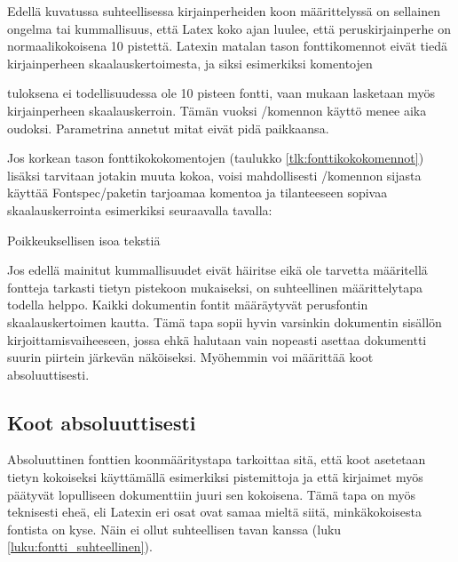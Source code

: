 Edellä kuvatussa suhteellisessa kirjainperheiden koon määrittelyssä on
sellainen ongelma tai kummallisuus, että Latex koko ajan luulee, että
peruskirjainperhe on normaalikokoisena 10 pistettä. Latexin matalan
tason fonttikomennot eivät tiedä kirjainperheen skaalauskertoimesta, ja
siksi esimerkiksi komentojen

\begin{koodilohkosis}
  \fontsize{10pt}{12pt} \selectfont
\end{koodilohkosis}

tuloksena ei todellisuudessa ole 10 pisteen fontti, vaan mukaan
lasketaan myös kirjainperheen skaalauskerroin. Tämän vuoksi \-/komennon käyttö menee aika oudoksi. Parametrina annetut
mitat eivät pidä paikkaansa.

Jos korkean tason font\-ti\-koko\-komen\-to\-jen (taulukko
\ref{tlk:fonttikokokomennot}) lisäksi tarvitaan jotakin muuta kokoa,
voisi mahdollisesti \-/komennon sijasta käyttää
Fontspec\-/paketin tarjoamaa komentoa ja tilanteeseen sopivaa
skaalauskerrointa esimerkiksi seuraavalla tavalla:

\begin{koodilohkosis}
   Poikkeuksellisen isoa tekstiä
\end{koodilohkosis}

Jos edellä mainitut kummallisuudet eivät häiritse eikä ole tarvetta
määritellä fontteja tarkasti tietyn pistekoon mukaiseksi, on
suhteellinen määrittelytapa todella helppo. Kaikki dokumentin fontit
määräytyvät perusfontin skaalauskertoimen kautta. Tämä tapa sopii hyvin
varsinkin dokumentin sisällön kirjoittamisvaiheeseen, jossa ehkä
halutaan vain nopeasti asettaa dokumentti suurin piirtein järkevän
näköiseksi. Myöhemmin voi määrittää koot absoluuttisesti.

\subsection{Koot absoluuttisesti}
\label{luku:fontti_absoluuttinen}

Absoluuttinen fonttien koonmääritystapa tarkoittaa sitä, että koot
asetetaan tietyn kokoiseksi käyttämällä esimerkiksi pistemittoja ja että
kirjaimet myös päätyvät lopulliseen dokumenttiin juuri sen kokoisena.
Tämä tapa on myös teknisesti eheä, eli Latexin eri osat ovat samaa
mieltä siitä, minkäkokoisesta fontista on kyse. Näin ei ollut
suhteellisen tavan kanssa (luku \ref{luku:fontti_suhteellinen}).

